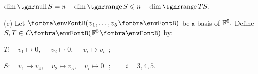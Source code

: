 \documentclass[a4paper, 11pt, UTF8]{article}
\begin{document}
\begin{large}
\Or $\dim\null S=n-\dim\range S\leqslant n-\dim\range TS.$\par\quad\Hb
{}\PfEnd\vspace{8pt}\quad
(c) Let $\Par{v_1,\dots,v_5}$ be a basis of ${\mathbb{F}}^5.$ Define $S,T\in\Lm{\Fbb^5}$ by:\par\quad\Hc
\hspace{60pt}$T:\quad v_1\mapsto 0,\quad\,\, v_2\mapsto 0,\,\,\quad v_i\mapsto v_i\,\,\,;$\par\quad\Hc
\hspace{60pt}$S:\quad v_1\mapsto v_4,\quad v_2\mapsto v_5,\quad v_i\mapsto 0\,\,\,\,;\qquad i=3,4,5.$\PfEnd
\SepLine


\end{large}
\end{document}

